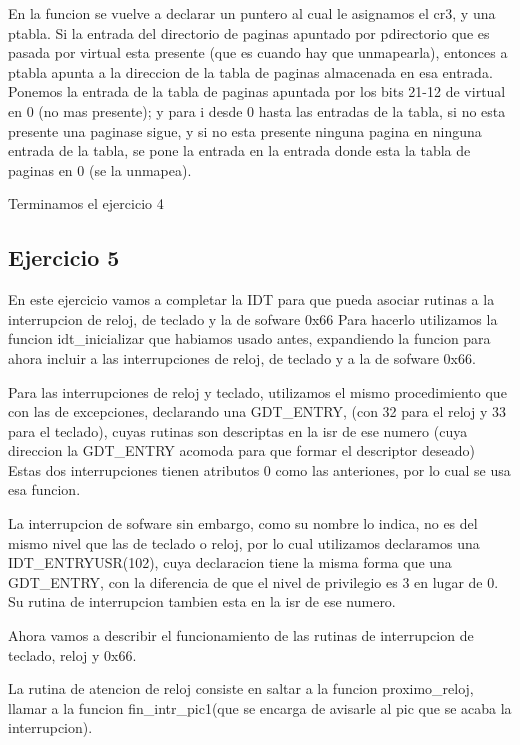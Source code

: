 \documentclass[a4paper]{article}
\begin{document}
En la funcion se vuelve a declarar un puntero al cual le asignamos el cr3, y una ptabla. Si la entrada  del directorio de paginas apuntado por pdirectorio que es pasada por virtual esta presente (que es cuando hay que unmapearla), entonces a ptabla apunta a la direccion de la tabla de paginas almacenada en esa entrada.
Ponemos la entrada de la tabla de paginas apuntada por los bits 21-12 de virtual en 0 (no mas presente); y para i desde 0 hasta las entradas de la tabla, si no esta presente una paginase sigue, y si no esta presente ninguna pagina en ninguna entrada de la tabla, se pone la entrada en la entrada donde esta la tabla de paginas en 0 (se la unmapea). 


  
Terminamos el ejercicio 4 

\newpage
\subsection{Ejercicio 5}

	En este ejercicio vamos a completar la IDT para que pueda asociar rutinas a la interrupcion de reloj, de teclado y la de sofware 0x66
Para hacerlo utilizamos la funcion idt_inicializar que habiamos usado antes, expandiendo la funcion para ahora incluir a las interrupciones de reloj, de teclado y a la de sofware 0x66.

	Para las interrupciones de reloj y teclado, utilizamos el mismo procedimiento que con las de excepciones, declarando una GDT_ENTRY, (con 32 para el reloj y 33 para el teclado), cuyas rutinas son descriptas en la isr de ese numero (cuya direccion la GDT_ENTRY acomoda para que formar el descriptor deseado) Estas dos interrupciones tienen atributos 0 como las anteriones, por lo cual se usa esa funcion.
	
	La interrupcion de sofware sin embargo, como su nombre lo indica, no es del mismo nivel que las de teclado o reloj,  por lo cual utilizamos declaramos una  IDT_ENTRYUSR(102), cuya declaracion tiene la misma forma que una GDT_ENTRY, con la diferencia de que el nivel de privilegio es 3 en lugar de 0. Su rutina de interrupcion tambien esta en la isr de ese numero.

	Ahora vamos a describir el funcionamiento de las rutinas de interrupcion de teclado, reloj y 0x66. 

	La rutina de atencion de reloj consiste en  saltar a  la funcion proximo_reloj, llamar a la funcion fin_intr_pic1(que se encarga de avisarle al pic que se acaba la interrupcion).	
	
\end{document}
